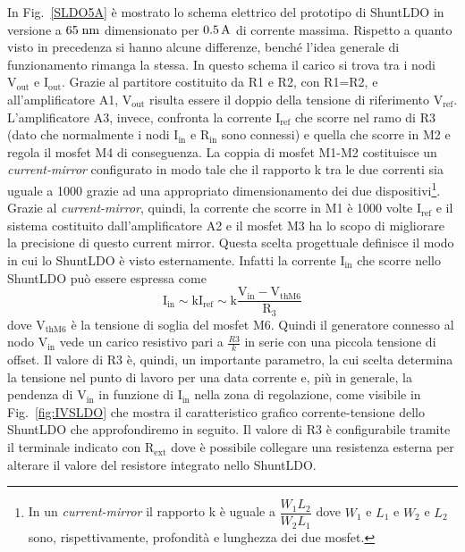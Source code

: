 In Fig.~\ref{SLDO5A} \`e mostrato lo schema elettrico del prototipo di ShuntLDO in versione a $65\rm \; nm$ dimensionato per $0.5\rm \, A$ di corrente massima.
Rispetto a quanto visto in precedenza si hanno alcune differenze, benché l'idea generale di funzionamento rimanga la stessa. 
In questo schema il carico si trova tra i nodi $\mathrm{V_{out}}$ e $\mathrm{I_{out}}$. Grazie al partitore costituito da R1 e R2, con R1=R2, e all'amplificatore A1, $\mathrm{V_{out}}$ risulta essere il doppio della tensione di riferimento $\mathrm{V_{ref}}$.
L'amplificatore A3, invece, confronta la corrente $\mathrm{I_{ref}}$ che scorre nel ramo di R3 (dato che normalmente i nodi $\mathrm{I_{in}}$ e $\mathrm{R_{in}}$ sono connessi) e quella che scorre in M2 e regola il mosfet M4 di conseguenza. 
La coppia di mosfet M1-M2 costituisce un \textit{current-mirror} configurato in modo tale che il rapporto k tra le due correnti sia uguale a 1000 grazie ad una appropriato dimensionamento dei due dispositivi\footnote{
  In un \textit{current-mirror} il rapporto k è uguale a $\dfrac{W_1L_2}{W_2L_1}$ dove $W_1$ e $L_1$ e $W_2$ e $L_2$ sono, rispettivamente, profondità e lunghezza dei due mosfet.
}. 
Grazie al \textit{current-mirror}, quindi, la corrente che scorre in M1 è 1000 volte $\mathrm{I_{ref}}$ e il sistema costituito dall'amplificatore A2 e il mosfet M3 ha lo scopo di migliorare la precisione di questo current mirror.
Questa scelta progettuale definisce il modo in cui lo ShuntLDO è visto esternamente. Infatti la corrente $\mathrm{I_{in}}$ che scorre nello ShuntLDO pu\`o essere espressa come
\begin{equation}
\mathrm{I_{in} \sim k I_{ref} \sim k \frac{V_{in} - V_{thM6}}{R_3}}
\label{eq:IV05amp}
\end{equation}
dove $\mathrm{V_{thM6}}$ \`e la tensione di soglia del mosfet M6. Quindi il generatore connesso al nodo $\mathrm{V_{in}}$ vede un carico resistivo pari a $\frac{R3}{k}$ in serie con una piccola tensione di offset. Il valore di R3 è, quindi, un importante parametro, la cui scelta determina la tensione nel punto di lavoro per una data corrente e, pi\`u in generale, la pendenza di $\mathrm{V_{in}}$ in funzione di $\mathrm{I_{in}}$ nella zona di regolazione, come visibile in Fig.~\ref{fig:IVSLDO} che mostra il caratteristico grafico corrente-tensione dello ShuntLDO che approfondiremo in seguito.
Il valore di R3 \`e configurabile tramite il terminale indicato con $\mathrm{R_{ext}}$ dove è possibile collegare una resistenza esterna per alterare il valore del resistore integrato nello ShuntLDO.
